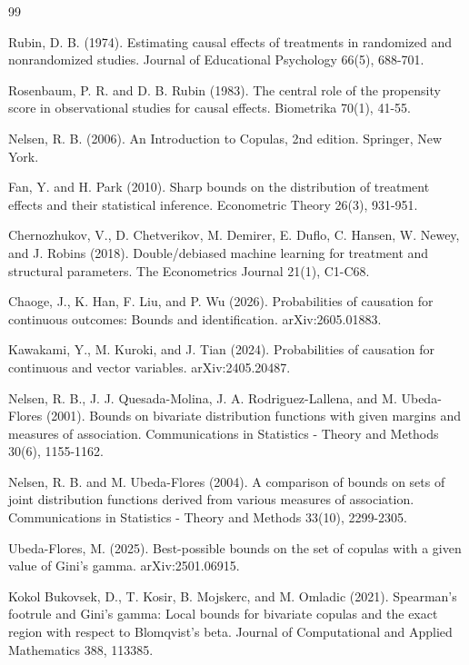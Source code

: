 \documentclass{article}
\begin{document}
\begin{thebibliography}{99}

   Rubin, D. B. (1974). Estimating causal effects of treatments in randomized and nonrandomized studies. Journal of Educational Psychology 66(5), 688-701.

   Rosenbaum, P. R. and D. B. Rubin (1983). The central role of the propensity score in observational studies for causal effects. Biometrika 70(1), 41-55.

   Nelsen, R. B. (2006). An Introduction to Copulas, 2nd edition. Springer, New York.

   Fan, Y. and H. Park (2010). Sharp bounds on the distribution of treatment effects and their statistical inference. Econometric Theory 26(3), 931-951.

   Chernozhukov, V., D. Chetverikov, M. Demirer, E. Duflo, C. Hansen, W. Newey, and J. Robins (2018). Double/debiased machine learning for treatment and structural parameters. The Econometrics Journal 21(1), C1-C68.

   Chaoge, J., K. Han, F. Liu, and P. Wu (2026). Probabilities of causation for continuous outcomes: Bounds and identification. arXiv:2605.01883.

   Kawakami, Y., M. Kuroki, and J. Tian (2024). Probabilities of causation for continuous and vector variables. arXiv:2405.20487.

   Nelsen, R. B., J. J. Quesada-Molina, J. A. Rodriguez-Lallena, and M. Ubeda-Flores (2001). Bounds on bivariate distribution functions with given margins and measures of association. Communications in Statistics - Theory and Methods 30(6), 1155-1162.

   Nelsen, R. B. and M. Ubeda-Flores (2004). A comparison of bounds on sets of joint distribution functions derived from various measures of association. Communications in Statistics - Theory and Methods 33(10), 2299-2305.

   Ubeda-Flores, M. (2025). Best-possible bounds on the set of copulas with a given value of Gini's gamma. arXiv:2501.06915.

   Kokol Bukovsek, D., T. Kosir, B. Mojskerc, and M. Omladic (2021). Spearman's footrule and Gini's gamma: Local bounds for bivariate copulas and the exact region with respect to Blomqvist's beta. Journal of Computational and Applied Mathematics 388, 113385.


\end{thebibliography}
\end{document}
